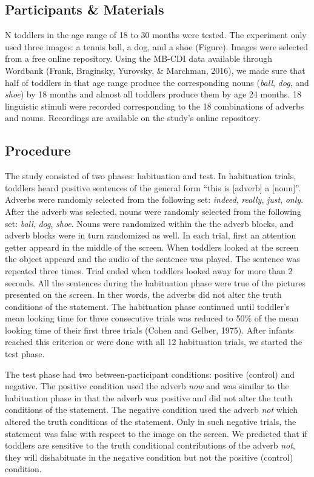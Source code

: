 \documentclass[man,floatsintext]{apa6}
\begin{document}
\hypertarget{participants-materials}{%
\subsection{Participants \& Materials}\label{participants-materials}}

N toddlers in the age range of 18 to 30 months were tested. The experiment only used three images: a tennis ball, a dog, and a shoe (Figure). Images were selected from a free online repository. Using the MB-CDI data available through Wordbank (Frank, Braginsky, Yurovsky, \& Marchman, 2016), we made sure that half of toddlers in that age range produce the corresponding nouns (\emph{ball}, \emph{dog}, and \emph{shoe}) by 18 months and almost all toddlers produce them by age 24 months. 18 linguistic stimuli were recorded corresponding to the 18 combinations of adverbs and nouns. Recordings are available on the study's online repository.

\hypertarget{procedure}{%
\subsection{Procedure}\label{procedure}}

The study consisted of two phases: habituation and test. In habituation trials, toddlers heard positive sentences of the general form \enquote{this is {[}adverb{]} a {[}noun{]}}. Adverbs were randomly selected from the following set: \emph{indeed}, \emph{really}, \emph{just}, \emph{only}. After the adverb was selected, nouns were randomly selected from the following set: \emph{ball}, \emph{dog}, \emph{shoe}. Nouns were randomized within the the adverb blocks, and adverb blocks were in turn randomized as well. In each trial, first an attention getter appeard in the middle of the screen. When toddlers looked at the screen the object appeard and the audio of the sentence was played. The sentence was repeated three times. Trial ended when toddlers looked away for more than 2 seconds. All the sentences during the habituation phase were true of the pictures presented on the screen. In ther words, the adverbs did not alter the truth conditions of the statement. The habituation phase continued until toddler's mean looking time for three consecutive trials was reduced to 50\% of the mean looking time of their first three trials (Cohen and Gelber, 1975). After infants reached this criterion or were done with all 12 habituation trials, we started the test phase.

The test phase had two between-participant conditions: positive (control) and negative. The positive condition used the adverb \emph{now} and was similar to the habituation phase in that the adverb was positive and did not alter the truth conditions of the statement. The negative condition used the adverb \emph{not} which altered the truth conditions of the statement. Only in such negative trials, the statement was false with respect to the image on the screen. We predicted that if toddlers are sensitive to the truth conditional contributions of the adverb \emph{not}, they will dishabituate in the negative condition but not the positive (control) condition.
\end{document}
